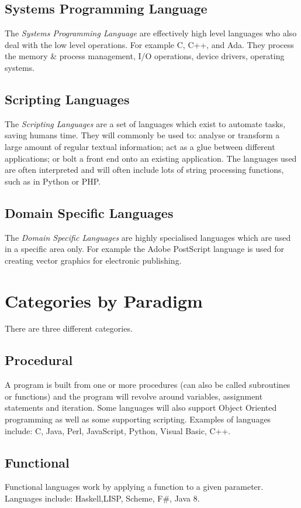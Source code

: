 \subsection{Systems Programming Language}
The \textit{Systems Programming Language} are effectively high level languages who also deal with the low level operations. For example C, C++, and Ada. They process the memory \& process management, I/O operations, device drivers, operating systems. 
\subsection{Scripting Languages}
The \textit{Scripting Languages} are a set of languages which exist to automate tasks, saving humans time. They will commonly be used to: analyse or transform a large amount of regular textual information; act as a glue between different applications; or bolt a front end onto an existing application. The languages used are often interpreted and will often include lots of string processing functions, such as in Python or PHP. 

\subsection{Domain Specific Languages}
The \textit{Domain Specific Languages} are highly specialised languages which are used in a specific area only. For example the Adobe PostScript language is used for creating vector graphics for electronic publishing.

\section{Categories by Paradigm}
There are three different categories.
\subsection{Procedural}
A program is built from one or more procedures (can also be called subroutines or functions) and the program will revolve around variables, assignment statements and iteration. Some languages will also support Object Oriented programming as well as some supporting scripting. Examples of languages include: C, Java, Perl, JavaScript, Python, Visual Basic, C++.
\subsection{Functional}
Functional languages work by applying a function to a given parameter. Languages include: Haskell,LISP, Scheme, F\#, Java 8. 
